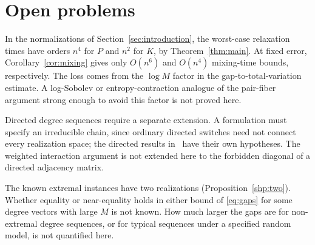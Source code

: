 \section{Open problems}\label{op:section}
In the normalizations of Section~\ref{sec:introduction}, the worst-case
relaxation times have orders $n^4$ for $P$ and $n^2$ for $K$, by
Theorem~\ref{thm:main}. At fixed error, Corollary~\ref{cor:mixing} gives only
$O(n^6)$ and $O(n^4)$ mixing-time bounds, respectively. The loss comes from
the $\log M$ factor in the gap-to-total-variation estimate. A log-Sobolev or
entropy-contraction analogue of the pair-fiber argument strong enough to
avoid this factor is not proved here.

Directed degree sequences require a separate extension. A formulation must
specify an irreducible chain, since ordinary directed switches need not
connect every realization space; the directed results
in~\cite{GS18,Unified22,CK18} have their own hypotheses. The weighted
interaction argument is not extended here to the forbidden diagonal of a
directed adjacency matrix.

The known extremal instances have two realizations
(Proposition~\ref{shp:two}). Whether equality or near-equality holds in
either bound of \eqref{eq:gaps} for some degree vectors with large $M$ is not
known. How much larger the gaps are for non-extremal degree sequences, or
for typical sequences under a specified random model, is not quantified
here.
